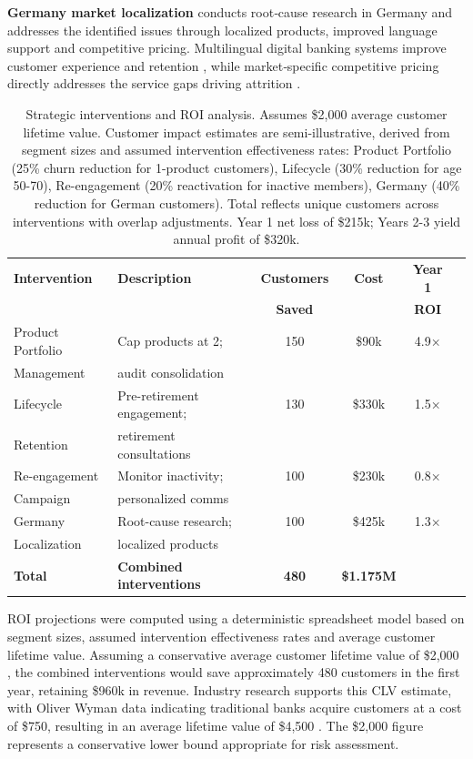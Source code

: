 \documentclass[12pt]{article}
\begin{document}
\textbf{Germany market localization} conducts root‑cause research in Germany and addresses the identified issues through localized products, improved language support and competitive pricing. Multilingual digital banking systems improve customer experience and retention \citep{hunsicker2023multilingual}, while market‑specific competitive pricing directly addresses the service gaps driving attrition \citep{smith2025switching}.

\begin{table}[H]
\centering
\small
\caption{Strategic interventions and ROI analysis. Assumes \$2,000 average customer lifetime value. Customer impact estimates are semi-illustrative, derived from segment sizes and assumed intervention effectiveness rates: Product Portfolio (25\% churn reduction for 1-product customers), Lifecycle (30\% reduction for age 50-70), Re-engagement (20\% reactivation for inactive members), Germany (40\% reduction for German customers). Total reflects unique customers across interventions with overlap adjustments. Year 1 net loss of \$215k; Years 2-3 yield annual profit of \$320k.}
\label{tab:roi_analysis}
\begin{tabular}{lp{5.5cm}cccc}
\toprule
\textbf{Intervention} & \textbf{Description} & \textbf{Customers} & \textbf{Cost} & \textbf{Year 1} \\
& & \textbf{Saved} & & \textbf{ROI} \\
\midrule
Product Portfolio & Cap products at 2; & 150 & \$90k & 4.9× \\
Management & audit consolidation & & & \\
\midrule
Lifecycle & Pre-retirement engagement; & 130 & \$330k & 1.5× \\
Retention & retirement consultations & & & \\
\midrule
Re-engagement & Monitor inactivity; & 100 & \$230k & 0.8× \\
Campaign & personalized comms & & & \\
\midrule
Germany & Root-cause research; & 100 & \$425k & 1.3× \\
Localization & localized products & & & \\
\midrule
\textbf{Total} & \textbf{Combined interventions} & \textbf{480} & \textbf{\$1.175M} & \\
\bottomrule
\end{tabular}
\end{table}

ROI projections were computed using a deterministic spreadsheet model based on segment sizes, assumed intervention effectiveness rates and average customer lifetime value. Assuming a conservative average customer lifetime value of \$2,000 \citep{meleis2010clv}, the combined interventions would save approximately 480 customers in the first year, retaining \$960k in revenue. Industry research supports this CLV estimate, with Oliver Wyman data indicating traditional banks acquire customers at a cost of \$750, resulting in an average lifetime value of \$4,500 \citep{chowdhry2019chime}. The \$2,000 figure represents a conservative lower bound appropriate for risk assessment.
\end{document}
